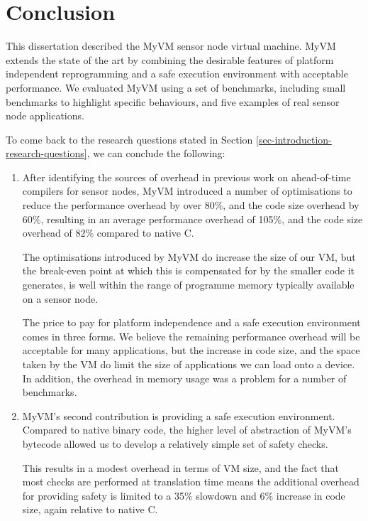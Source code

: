\chapter{Conclusion}
This dissertation described the MyVM sensor node virtual machine. MyVM extends the state of the art by combining the desirable features of platform independent reprogramming and a safe execution environment with acceptable performance. We evaluated MyVM using a set of benchmarks, including small benchmarks to highlight specific behaviours, and five examples of real sensor node applications.

To come back to the research questions stated in Section \ref{sec-introduction-research-questions}, we can conclude the following:

\begin{enumerate}
	\item
	After identifying the sources of overhead in previous work on ahead-of-time compilers for sensor nodes, MyVM introduced a number of optimisations to reduce the performance overhead by over 80\%, and the code size overhead by 60\%, resulting in an average performance overhead of 105\%, and the code size overhead of 82\% compared to native C.

	The optimisations introduced by MyVM do increase the size of our VM, but the break-even point at which this is compensated for by the smaller code it generates, is well within the range of programme memory typically available on a sensor node.

	The price to pay for platform independence and a safe execution environment comes in three forms. We believe the remaining performance overhead will be acceptable for many applications, but the increase in code size, and the space taken by the VM do limit the size of applications we can load onto a device. In addition, the overhead in memory usage was a problem for a number of benchmarks.

	\item
	MyVM's second contribution is providing a safe execution environment. Compared to native binary code, the higher level of abstraction of MyVM's bytecode allowed us to develop a relatively simple set of safety checks.
	
	This results in a modest overhead in terms of VM size, and the fact that most checks are performed at translation time means the additional overhead for providing safety is limited to a 35\% slowdown and 6\% increase in code size, again relative to native C.


\end{enumerate}
